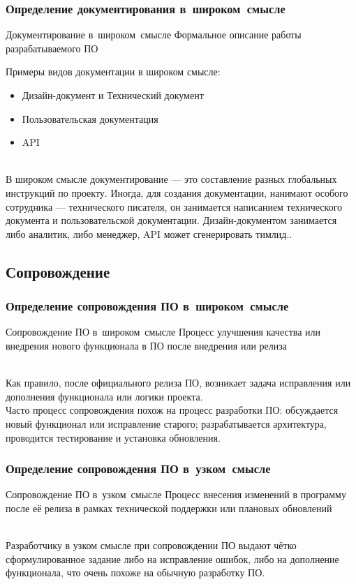 \documentclass[lecturenotes]{../industrial-development}
\begin{document}
\begin{frame} \frametitle{Определение документирования в~широком~смысле}
	\begin{block}{Документирование в~широком~смысле}
		Формальное описание работы разрабатываемого ПО 
	\end{block}
	\vspace{\baselineskip}
	Примеры видов документации в широком смысле:
	\begin{itemize}
		\item Дизайн-документ и Технический документ
		\item Пользовательская документация
		\item API
	\end{itemize}
\end{frame}
\lecturenotes
\\В широком смысле документирование --- это составление разных глобальных инструкций по проекту. Иногда, для создания документации, нанимают особого сотрудника --- технического писателя, он занимается написанием технического документа и пользовательской документации. Дизайн-документом занимается либо аналитик, либо менеджер, API может сгенерировать тимлид..

\subsection{Сопровождение}
\begin{frame} \frametitle{Определение сопровождения ПО в~широком~смысле}
	\begin{block}{Сопровождение ПО в~широком~смысле}
		Процесс улучшения качества или внедрения нового функционала в ПО после внедрения или релиза
	\end{block}
\end{frame}
\lecturenotes
\\Как правило, после официального релиза ПО, возникает задача исправления или дополнения функционала или логики проекта.\\
Часто процесс сопровождения похож на процесс разработки ПО: обсуждается новый функционал или исправление старого; разрабатывается архитектура, проводится тестирование и установка обновления. 

\begin{frame} \frametitle{Определение сопровождения ПО в~узком~смысле}
	\begin{block}{Сопровождение ПО в~узком~смысле}
		Процесс внесения изменений в программу после её релиза в рамках технической поддержки или плановых обновлений
	\end{block}
\end{frame}
\lecturenotes
\\Разработчику в узком смысле при сопровождении ПО выдают чётко сформулированное задание либо на исправление ошибок, либо на дополнение функционала, что очень похоже на обычную разработку ПО. 
\end{document}
